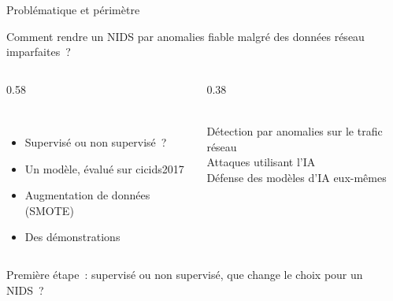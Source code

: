 \begin{frame}{Problématique et périmètre}
  \begin{idee}
    \centering\large
    Comment rendre un NIDS par anomalies fiable malgré des données réseau imparfaites~?
  \end{idee}
  \vspace{0.3cm}
  \begin{columns}[T]
    \begin{column}{0.58\textwidth}
      \begin{carte}[height=3.1cm,valign=top]
        \\[0.1cm]
        \begin{itemize}
          \item Supervisé ou non supervisé~?
          \item Un modèle, évalué sur cicids2017
          \item Augmentation de données (SMOTE)
          \item Des démonstrations
        \end{itemize}
      \end{carte}
    \end{column}
    \begin{column}{0.38\textwidth}
      \begin{carte}[height=3.1cm,valign=top]
        \\[0.1cm]
        \oui Détection par anomalies sur le trafic réseau\\[0.1cm]
        \non Attaques utilisant l'IA\\[0.05cm]
        \non Défense des modèles d'IA eux-mêmes
      \end{carte}
    \end{column}
  \end{columns}
  \vspace{0.3cm}
  \begin{pcompact}
    \centering
    Première étape~: supervisé ou non supervisé, que change le choix pour un NIDS~?
  \end{pcompact}
\end{frame}
